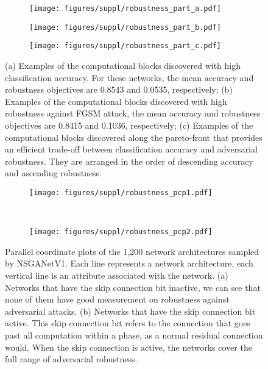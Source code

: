 \documentclass[journal]{IEEEtran}
\def\ourmethod{NSGANetV1}
\theoremstyle{definition}
\theoremstyle{remark}
\begin{document}
\begin{figure}
    \centering
    \begin{subfigure}{0.3\textwidth}
        \centering
        \texttt{[image: figures/suppl/robustness\_part\_a.pdf]}
        \caption{\label{fig:accurate_phases}}
    \end{subfigure}\begin{subfigure}{0.175\textwidth}
        \centering
        \texttt{[image: figures/suppl/robustness\_part\_b.pdf]}
        \caption{\label{fig:robust_phases}}
    \end{subfigure}
    \begin{subfigure}{0.48\textwidth}
        \centering
        \texttt{[image: figures/suppl/robustness\_part\_c.pdf]}
        \caption{\label{fig:pareto_phases}}
    \end{subfigure}
    \caption{(a) Examples of the computational blocks discovered with high classification accuracy. For these networks, the mean accuracy and robustness objectives are 0.8543 and 0.0535, respectively; (b) Examples of the computational blocks discovered with high robustness against FGSM attack, the mean accuracy and robustness objectives are 0.8415 and 0.1036, respectively; (c) Examples of the computational blocks discovered along the pareto-front that provides an efficient trade-off between classification accuracy and adversarial robustness. They are arranged in the order of descending accuracy and ascending robustness.}
\end{figure}

\begin{figure}
    \centering
    \begin{subfigure}{0.48\textwidth}
        \texttt{[image: figures/suppl/robustness\_pcp1.pdf]}
        \caption{\label{fig:robustness_pcp}}
    \end{subfigure}\\
    \begin{subfigure}{0.48\textwidth}
        \texttt{[image: figures/suppl/robustness\_pcp2.pdf]}
        \caption{\label{fig:robustness_pcp2}}
    \end{subfigure}\caption{Parallel coordinate plots of the 1,200 network architectures sampled by \ourmethod{}. Each line represents a network architecture, each vertical line is an attribute associated with the network. (a) Networks that have the skip connection bit inactive, we can see that none of them have good measurement on robustness against adversarial attacks. (b) Networks that have the skip connection bit active. This skip connection bit refers to the connection that goes past all computation within a phase, as a normal residual connection would. When the skip connection is active, the networks cover the full range of adversarial robustness.}
\end{figure}
\end{document}
